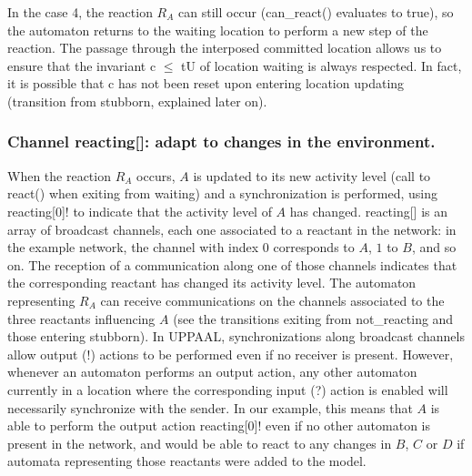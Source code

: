 \documentclass{llncs}
\begin{document}
In the case 4, the reaction $R_A$ can still occur ({\sf can\_react()} evaluates to true), so the automaton
returns to the {\sf waiting} location to perform a new step of the reaction. The passage through
the interposed committed location allows us to ensure
that the invariant {\sf c $\leq$ tU} of location {\sf waiting} is always respected. In fact, it is
possible that {\sf c} has not been reset upon entering location {\sf updating} (transition
from {\sf stubborn}, explained later on).

\subsubsection{Channel {\sf reacting[]}: adapt to changes in the environment.}
When the reaction $R_A$ occurs, $A$ is updated to its new activity level (call to {\sf react()} when
exiting from {\sf waiting}) and a synchronization is performed, using {\sf reacting[0]!}
to indicate that the activity level of $A$ has changed. {\sf reacting[]} is an array of broadcast channels,
each one associated to a reactant in the network: in the example network, the channel with index $0$ corresponds to $A$, $1$ to $B$,
and so on. The reception of a communication along one of those channels
indicates that the corresponding reactant has changed its activity level. The automaton representing $R_A$
can receive communications on the channels associated to the three reactants influencing $A$ (see the transitions
exiting from {\sf not\_reacting} and those entering {\sf stubborn}).
In UPPAAL, synchronizations
along broadcast channels allow output ({\sf !}) actions to be performed even if no receiver is present. However,
whenever an automaton performs an output action, any other automaton currently in a location where the
corresponding input ({\sf ?}) action is enabled will necessarily synchronize with the sender.
In our example, this means that $A$ is able to perform the output action {\sf reacting[0]!}
even if no other automaton is present in the network, and would be able to react to any changes
in $B$, $C$ or $D$ if automata representing those reactants were added to the model.
\end{document}
